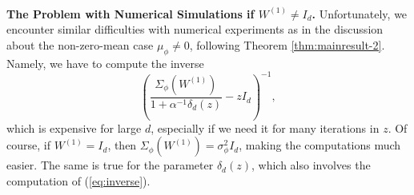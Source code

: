 \documentclass{article}
\begin{document}
\bigskip
\bigskip
\\
\textbf{The Problem with Numerical Simulations if $W^{(1)}\neq I_d$.} Unfortunately, we encounter similar difficulties with numerical experiments as in the discussion about the non-zero-mean case $\mu_\phi\neq0$, following Theorem \ref{thm:mainresult-2}. Namely, we have to compute the inverse
\begin{equation}
\left(\frac{\Sigma_\phi(W^{(1)})}{1+\alpha^{-1}\delta_d(z)}-zI_d\right)^{-1},\label{eq:inverse}
\end{equation}
which is expensive for large $d$, especially if we need it for many iterations in $z$. Of course, if $W^{(1)}=I_d$, then $\Sigma_\phi(W^{(1)})=\sigma_\phi^2I_d$, making the computations much easier. The same is true for the parameter $\delta_d(z)$, which also involves the computation of (\ref{eq:inverse}).
\end{document}
